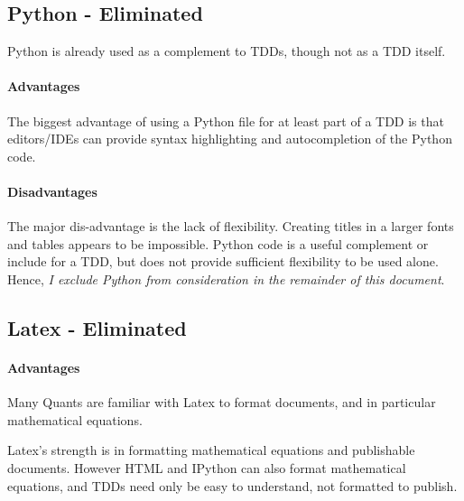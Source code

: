 \documentclass[]{article}
\begin{document}
\subsection{Python - Eliminated}
	Python is already used as a complement to TDDs, though not as a TDD itself.
	\paragraph{Advantages}
		The biggest advantage of using a Python file for at least part of a TDD 
	is that editors/IDEs can provide syntax highlighting and autocompletion of the Python code.
	
	\paragraph{Disadvantages}	
	The major dis-advantage is the lack of flexibility.  Creating titles in a larger fonts and tables appears to be impossible.  
	Python code is a useful complement or include for a TDD, but does not provide sufficient flexibility to be used alone.  
	Hence, \emph{I exclude Python from consideration in the remainder of this document}.


\subsection{Latex - Eliminated}
	\paragraph{Advantages}
	
	Many Quants are familiar with Latex to format documents, and in particular mathematical equations.
	
	Latex's strength is in formatting mathematical equations and publishable documents.  
	However HTML and IPython can also format mathematical equations, and TDDs need only be easy to understand, not formatted to publish.
	
\end{document}
